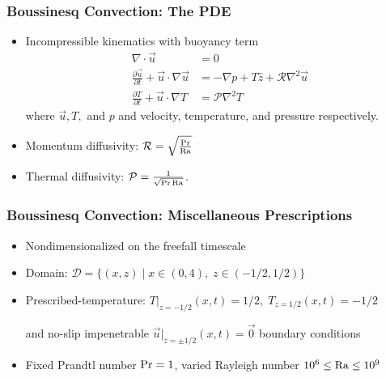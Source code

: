 


\begin{frame}[fragile]
    \frametitle{Boussinesq Convection: The PDE}
    \begin{itemize}
        \item Incompressible kinematics with buoyancy term
        \begin{align}
            \nabla \cdot \vec{u} &= 0 \label{EQ:motion1}\\
            \frac{\partial \vec{u}}{\partial t} + \vec{u} \cdot \nabla \vec{u} &= - \nabla p + T \hat{z} + \mathcal{R} \nabla^2 \vec{u} \label{EQ:motion2}\\
            \frac{\partial T}{\partial t} + \vec{u} \cdot \nabla T &= \mathcal{P} \nabla^2 T \label{EQ:motion3}
        \end{align}
        where $\vec{u},T,$ and $p$ and velocity, temperature, and pressure respectively.
        \vspace{0.2cm}
        \item Momentum diffusivity: $\mathcal{R} = \sqrt{\frac{\Pr}{\mathrm{Ra}}}$ 
        
        \item Thermal diffusivity: $\mathcal{P} = \frac{1}{\sqrt{\Pr \mathrm{Ra}}}$.
    \end{itemize}
\end{frame}


\begin{frame}[fragile]
    \frametitle{Boussinesq Convection: Miscellaneous Prescriptions}

    \begin{itemize}
        
        \item Nondimensionalized on the freefall timescale\newline
        \item Domain: $\mathcal{D}=\{ (x,z)\;|\; x\in(0,4),\; z\in(-1/2,1/2)\}$\newline
        \item Prescribed-temperature:
        $T|_{z=-1/2}(x,t)=1/2, \; T_{z=1/2}(x,t)=-1/2$\newline

        and no-slip impenetrable $\vec{u}|_{z=\pm1/2}(x,t) = \vec{0}$ boundary conditions\newline

        \item Fixed Prandtl number $\rm{Pr}=1$, varied Rayleigh number $10^6\leq \rm{Ra}\leq 10^9$
    \end{itemize}
\end{frame}


